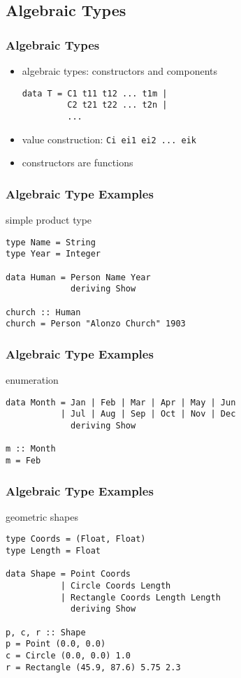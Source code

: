 \documentclass[dvipsnames]{beamer}
\theoremstyle{plain}
\begin{document}
\subsection{Algebraic Types}

\begin{frame}[fragile]
  \frametitle{Algebraic Types}

  \begin{itemize}
    \item \alert{algebraic types}: constructors and components
    \begin{lstlisting}
data T = C1 t11 t12 ... t1m |
         C2 t21 t22 ... t2n |
         ...
    \end{lstlisting}
    \item value construction: \lstinline|Ci ei1 ei2 ... eik|
    \item constructors are functions
  \end{itemize}
\end{frame}

\begin{frame}[fragile]
  \frametitle{Algebraic Type Examples}

  \begin{exampleblock}{simple product type}
    \begin{lstlisting}
type Name = String
type Year = Integer

data Human = Person Name Year
             deriving Show

church :: Human
church = Person "Alonzo Church" 1903
    \end{lstlisting}
  \end{exampleblock}
\end{frame}

\begin{frame}[fragile]
  \frametitle{Algebraic Type Examples}

  \begin{exampleblock}{enumeration}
    \begin{lstlisting}
data Month = Jan | Feb | Mar | Apr | May | Jun
           | Jul | Aug | Sep | Oct | Nov | Dec
             deriving Show

m :: Month
m = Feb
    \end{lstlisting}
  \end{exampleblock}
\end{frame}

\begin{frame}[fragile]
  \frametitle{Algebraic Type Examples}

  \begin{exampleblock}{geometric shapes}
    \begin{lstlisting}
type Coords = (Float, Float)
type Length = Float

data Shape = Point Coords
           | Circle Coords Length
           | Rectangle Coords Length Length
             deriving Show

p, c, r :: Shape
p = Point (0.0, 0.0)
c = Circle (0.0, 0.0) 1.0
r = Rectangle (45.9, 87.6) 5.75 2.3
    \end{lstlisting}
  \end{exampleblock}
\end{frame}
\end{document}
